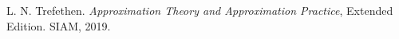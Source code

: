 L. N. Trefethen. \emph{Approximation Theory and Approximation Practice}, Extended Edition. SIAM, 2019.
